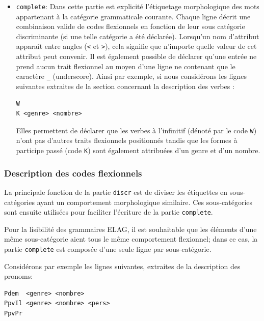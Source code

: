 \begin{itemize}
\item \verb$complete$: Dans cette partie est explicité l’étiquetage
morphologique des mots appartenant à la catégorie grammaticale courante. Chaque ligne décrit
une combinaison valide de codes flexionnels en fonction de leur sous catégorie discriminante
(si une telle catégorie a été déclarée). Lorsqu’un nom d’attribut apparaît entre angles
(\verb$<$ et \verb$>$), cela signifie que n’importe quelle valeur de cet attribut peut convenir.
 Il est également possible de déclarer qu’une entrée ne prend aucun trait flexionnel au moyen d’une
 ligne ne contenant que le caractère \verb$_$ (underscore).\index{\verbc{_}} Ainsi par exemple, si
 nous considérons les lignes suivantes extraites de la section concernant la description des verbes :



\begin{verbatim}
W
K <genre> <nombre>
\end{verbatim}

Elles permettent de déclarer que les verbes à l’infinitif (dénoté par le code
\verb$W$) n’ont pas d’autres traits flexionnels positionnés tandis que les formes
à participe passé (code \verb$K$) sont également attribuées d’un genre et d’un nombre.

\end{itemize}

\subsubsection{Description des codes flexionnels}
La principale fonction de la partie \verb$discr$ est de diviser les étiquettes en sous-catégories
ayant un comportement morphologique similaire. Ces sous-catégories sont ensuite utilisées
pour faciliter l’écriture de la partie \verb$complete$.

\bigskip
\noindent Pour la lisibilité des grammaires ELAG, il est souhaitable que les éléments d’une même
sous-catégorie aient tous le même comportement flexionnel; dans ce cas, la partie \verb$complete$ 
est composée d’une seule ligne par sous-catégorie.

Considérons par exemple les lignes suivantes, extraites de la description des pronoms:

\begin{verbatim}
Pdem  <genre> <nombre>
PpvIl <genre> <nombre> <pers>
PpvPr
\end{verbatim}

